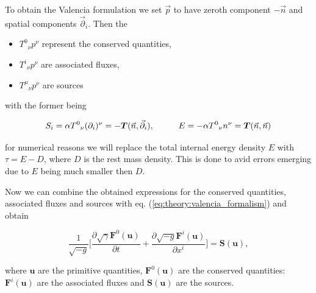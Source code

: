 \documentclass[11pt,a4paper,headinclude=true,DIV=14,BCOR=8mm,chapterprefix,listof=totoc,twoside,openright,abstracton]{scrbook}
\begin{document}
To obtain the Valencia formulation we set $\vec{p}$ to have zeroth component $-\vec{n}$ and spatial components $\vec{\partial}_i$. Then the

\begin{itemize}
    \item ${T^0}_{\nu}p^{\nu}$ represent the conserved quantities,
    \item ${T^i}_{\nu}p^{\nu}$ are associated fluxes,
    \item ${T^{\mu}}_{\nu}p^{\nu}$ are sources
\end{itemize}

with the former being 

\begin{equation}
S_{i} = \alpha {T^0}_{\nu}(\partial_i)^{\nu}=-\boldsymbol{T}(\vec{n},\vec{\partial}_i), \hspace{10mm} E = -\alpha{T^0}_{\nu}n^{\nu} = \boldsymbol{T}(\vec{n},\vec{n})
\end{equation}

for numerical reasons we will replace the total internal energy density $E$ with $\tau = E-D$, where $D$ is the rest mass density. This is done to avid errors emerging due to $E$ being much smaller then $D$. 

Now we can combine the obtained expressions for the conserved quantities, associated fluxes and sources with eq. (\ref{eq:theory:valencia_formalism}) and obtain

\begin{equation}
\frac{1}{\sqrt{-g}}\Big[\frac{\partial\sqrt{\gamma}\boldsymbol{F}^{0}(\boldsymbol{u})}{\partial t} + \frac{\partial\sqrt{-g}\boldsymbol{F}^{i}(\boldsymbol{u})}{\partial x^i}\Big] = \boldsymbol{S}(\boldsymbol{u}),
\label{eq:theory:grhdeq_thc} %
\end{equation}

where $\boldsymbol{u}$ are the primitive quantities,
$\boldsymbol{F}^0(\boldsymbol{u})$ are the conserved quantities: 
$\boldsymbol{F}^i(\boldsymbol{u})$ are the associated fluxes
and $\boldsymbol{S}(\boldsymbol{u})$ are the sources.
\end{document}
